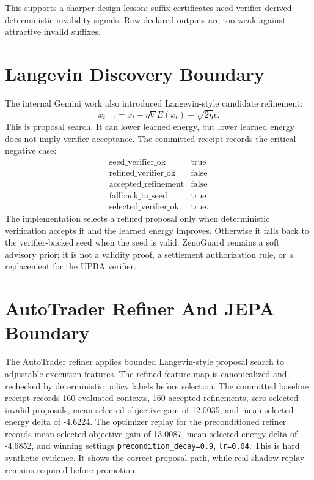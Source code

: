 \documentclass[11pt]{article}
\begin{document}
This supports a sharper design lesson: suffix certificates need
verifier-derived deterministic invalidity signals. Raw declared outputs are too
weak against attractive invalid suffixes.

\section{Langevin Discovery Boundary}

The internal Gemini work also introduced Langevin-style candidate refinement:
\[
  x_{t+1} = x_t - \eta \nabla E(x_t) + \sqrt{2\eta}\epsilon.
\]
This is proposal search. It can lower learned energy, but lower learned energy
does not imply verifier acceptance. The committed receipt records the critical
negative case:
\[
\begin{array}{ll}
\mathrm{seed\_verifier\_ok} & \mathrm{true}\\
\mathrm{refined\_verifier\_ok} & \mathrm{false}\\
\mathrm{accepted\_refinement} & \mathrm{false}\\
\mathrm{fallback\_to\_seed} & \mathrm{true}\\
\mathrm{selected\_verifier\_ok} & \mathrm{true}.
\end{array}
\]
The implementation selects a refined proposal only when deterministic
verification accepts it and the learned energy improves. Otherwise it falls
back to the verifier-backed seed when the seed is valid. ZenoGuard remains a
soft advisory prior; it is not a validity proof, a settlement authorization
rule, or a replacement for the UPBA verifier.

\section{AutoTrader Refiner And JEPA Boundary}

The AutoTrader refiner applies bounded Langevin-style proposal search to
adjustable execution features. The refined feature map is canonicalized and
rechecked by deterministic policy labels before selection. The committed
baseline receipt records 160 evaluated contexts, 160 accepted refinements, zero
selected invalid proposals, mean selected objective gain of 12.0035, and mean
selected energy delta of -4.6224. The optimizer replay for the preconditioned
refiner records mean selected objective gain of 13.0087, mean selected energy
delta of -4.6852, and winning settings
\texttt{precondition\_decay=0.9}, \texttt{lr=0.04}. This is hard synthetic
evidence. It shows the correct proposal path, while real shadow replay remains
required before promotion.
\end{document}
